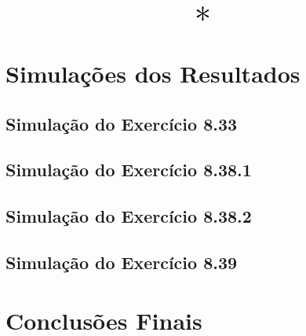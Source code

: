 \documentclass{report}
\let\oldsection\section
\renewcommand\section{\clearpage\oldsection}
\begin{document}
\begin{center}
      \[ \scalebox{3}{$ * $} \]
\end{center}

\section{Simulações dos Resultados}
\subsection{Simulação do Exercício 8.33}
\subsection{Simulação do Exercício 8.38.1}
\subsection{Simulação do Exercício 8.38.2}
\subsection{Simulação do Exercício 8.39}
\section{Conclusões Finais}
\end{document}
